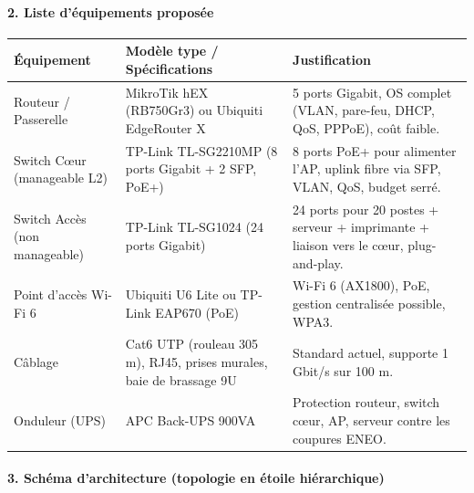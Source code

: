 \documentclass[11pt]{article}
\begin{document}
\begin{exoresolu}
\paragraph{2. Liste d'équipements proposée}
\begin{center}
\begin{tabularx}{\linewidth}{|l|X|X|}\hline
\textbf{Équipement} & \textbf{Modèle type / Spécifications} & \textbf{Justification} \\\hline
Routeur / Passerelle & MikroTik hEX (RB750Gr3) ou Ubiquiti EdgeRouter X & 5 ports Gigabit, OS complet (VLAN, pare-feu, DHCP, QoS, PPPoE), coût faible. \\\hline
Switch Cœur (manageable L2) & TP-Link TL-SG2210MP (8 ports Gigabit + 2 SFP, PoE+) & 8 ports PoE+ pour alimenter l'AP, uplink fibre via SFP, VLAN, QoS, budget serré. \\\hline
Switch Accès (non manageable) & TP-Link TL-SG1024 (24 ports Gigabit) & 24 ports pour 20 postes + serveur + imprimante + liaison vers le cœur, plug-and-play. \\\hline
Point d'accès Wi-Fi 6 & Ubiquiti U6 Lite ou TP-Link EAP670 (PoE) & Wi-Fi 6 (AX1800), PoE, gestion centralisée possible, WPA3. \\\hline
Câblage & Cat6 UTP (rouleau 305 m), RJ45, prises murales, baie de brassage 9U & Standard actuel, supporte 1 Gbit/s sur 100 m. \\\hline
Onduleur (UPS) & APC Back-UPS 900VA & Protection routeur, switch cœur, AP, serveur contre les coupures ENEO. \\\hline
\end{tabularx}
\end{center}

\paragraph{3. Schéma d'architecture (topologie en étoile hiérarchique)}
\begin{popfigure}
\end{popfigure}
\end{exoresolu}
\end{document}
